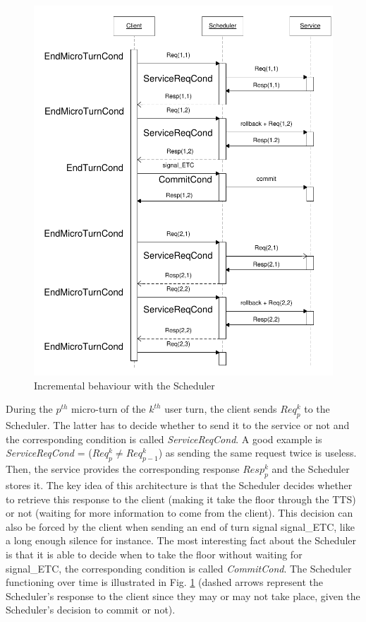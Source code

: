     	\begin{figure}[htp]
          \centering
          \includegraphics[scale=0.8]{figures/SchedulerDiagEng.pdf}
          \caption{Incremental behaviour with the Scheduler}
          \label{fig:schedchrono}
        \end{figure}
    
    	During the $p^{th}$ micro-turn of the $k^{th}$ user turn, the client sends $Req^k_p$ to the Scheduler. The latter has to decide whether to send it to the service or not and the corresponding condition is called \textit{ServiceReqCond}. A good example is \textit{ServiceReqCond} = ($Req^k_p \neq Req^k_{p-1}$) as sending the same request twice is useless. Then, the service provides the corresponding response $Resp^k_p$ and the Scheduler stores it. The key idea of this architecture is that the Scheduler decides whether to retrieve this response to the client (making it take the floor through the TTS) or not (waiting for more information to come from the client). This decision can also be forced by the client when sending an end of turn signal signal\_ETC, like a long enough silence for instance. The most interesting fact about the Scheduler is that it is able to decide when to take the floor without waiting for signal\_ETC, the corresponding condition is called \textit{CommitCond}. The Scheduler functioning over time is illustrated in Fig. \ref{fig:schedchrono} (dashed arrows represent the Scheduler's response to the client since they may or may not take place, given the Scheduler's decision to commit or not).
        
